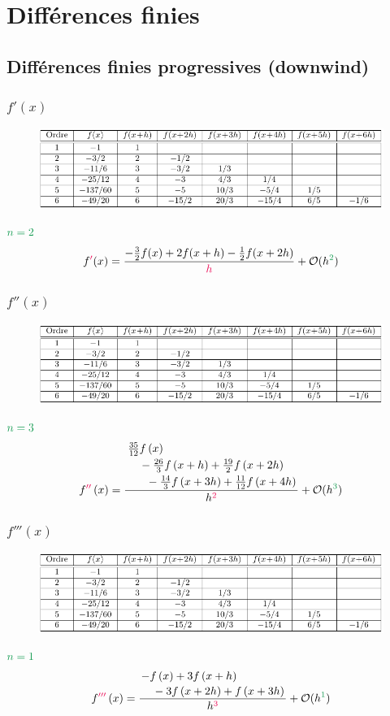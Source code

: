 \documentclass[resume]{subfiles}
\begin{document}
\section{Différences finies}
\subsection{Différences finies progressives (downwind)}
\subsubsection{$f'(x)$}
\begin{figure}[H]
\centering
\includegraphics[width=\columnwidth,page=1]{diff_finies_tableaux.pdf}
\end{figure}
$\textcolor{ForestGreen}{n=2}$
$$f\textcolor{OrangeRed}{'}(x)=\frac{-\frac{3}{2}f(x)+2f(x+h)-\frac{1}{2}f(x+2h)}{\textcolor{OrangeRed}{h}}+\mathcal{O}(h^{\textcolor{ForestGreen}{2}})$$
\subsubsection{$f''(x)$}
\begin{figure}[H]
\centering
\includegraphics[width=\columnwidth,page=2]{diff_finies_tableaux.pdf}
\end{figure}
$\textcolor{ForestGreen}{n=3}$
$$f\textcolor{OrangeRed}{''}\left(x\right)=\frac{\splitdfrac{\splitdfrac{\frac{35}{12}f\left(x\right)}{-\frac{26}{3}f\left(x+h\right)+\frac{19}{2}f\left(x+2h\right)}}{-\frac{14}{3}f\left(x+3h\right)+\frac{11}{12}f\left(x+4h\right)}}{h^{\textcolor{OrangeRed}{2}}}+\mathcal{O}(h^{\textcolor{ForestGreen}{3}})$$
\subsubsection{$f'''(x)$}
\begin{figure}[H]
\centering
\includegraphics[width=\columnwidth,page=3]{diff_finies_tableaux.pdf}
\end{figure}
$\textcolor{ForestGreen}{n=1}$
$$f\textcolor{OrangeRed}{'''}\left(x\right)=\frac{\splitdfrac{-f\left(x\right)+3f\left(x+h\right)}{-3f\left(x+2h\right)+f\left(x+3h\right)}}{h^{\textcolor{OrangeRed}{3}}}+\mathcal{O}(h^{\textcolor{ForestGreen}{1}})$$
\end{document}
